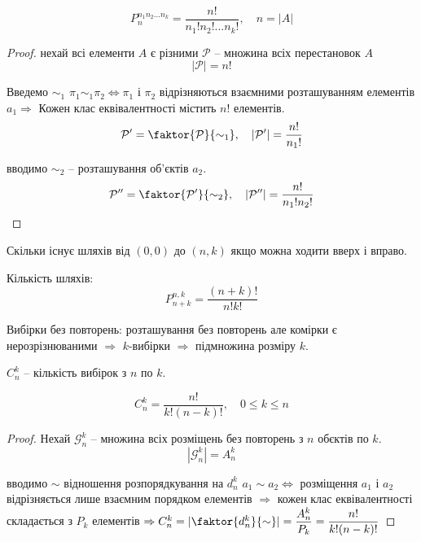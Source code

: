 \begin{claim}
    $$P_n^{n_1 n_2 ...n_k} = \dfrac{n!}{n_1! n_2! ... n_k!}, \quad n = |A|$$
\end{claim}
\begin{proof}
    нехай всі елементи $A$ є різними
    $\mathcal{P}$ -- множина всіх перестановок $A$
    $$|\mathcal{P}| = n!$$    
    
    Введемо $\sim_1$ $\pi_1 \sim_1 \pi_2 \Leftrightarrow \pi_1$ і $\pi_2$
    відрізняються взаємними розташуванням елементів $a_1 \Rightarrow$
    Кожен клас еквівалентності містить $n!$ елементів.
    $$\mathcal{P}' = \faktor{\mathcal{P}}{\sim_1}, \quad |\mathcal{P}'| = \dfrac{n!}{n_1!}$$
    
    вводимо $\sim_2$ -- розташування об'єктів $a_2$.
    $$\mathcal{P}'' = \faktor{\mathcal{P}'}{\sim_2}, \quad |\mathcal{P}''| = \dfrac{n!}{n_1!n_2!}$$
\end{proof}


\begin{example}
    
    
    Скільки існує шляхів від $(0, 0)$ до $(n, k)$
    якщо можна ходити вверх і вправо.
    
    Кількість шляхів:
    $$P_{n+k}^{n, k} = \dfrac{(n+k)!}{n!k!}$$
\end{example}

\begin{definition}
    Вибірки без повторень: розташування без повторень але комірки
    є нерозрізнюваними $\Rightarrow$ $k$-вибірки $\Rightarrow$
    підмножина розміру $k$.

    $C_n^k$ -- кількість вибірок з $n$ по $k$.
\end{definition}


\begin{claim}
    $$C_n^k = \dfrac{n!}{k! (n-k)!}, \quad 0 \leqslant k \leqslant n$$
\end{claim}
\begin{proof}
    Нехай $\mathcal{G}_n^k$ -- множина всіх розміщень без повторень з $n$
    обєктів по $k$.
    $$|\mathcal{G}_n^k| = A_n^k$$
    
    вводимо $\sim$ відношення розпорядкування на $d_n^k$
    $a_1 \sim a_2 \Leftrightarrow$ розміщення $a_1$ і $a_2$
    відрізняється лише взаємним порядком елементів $\Rightarrow$
    кожен клас еквівалентності складається з $P_k$ елементів
    $\Rightarrow C_n^k = |\faktor{d_n^k}{\sim}| = \dfrac{A_n^k}{P_k} = \dfrac{n!}{k!(n-k)!}$
\end{proof}

